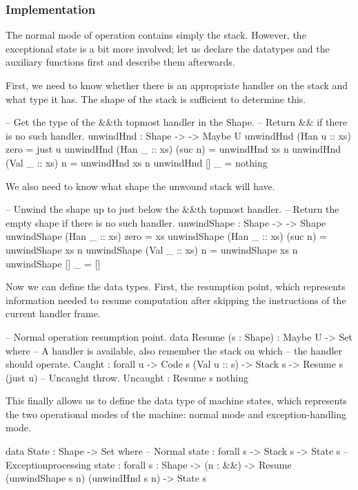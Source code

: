 
\subsubsection{Implementation}

The normal mode of operation contains simply the stack. However, the exceptional state
is a bit more involved; let us declare the datatypes and the auxiliary functions first
and describe them afterwards.

First, we need to know whether there is an appropriate handler on the stack and what type
it has. The shape of the stack is sufficient to determine this.
\begin{code}
  -- Get the type of the &&\-th top\-most handler in the Shape.
  -- Return && if there is no such handler.
  unwindHnd : Shape -> \bN -> Maybe U
  unwindHnd (Han u :: xs) zero    = just u
  unwindHnd (Han _ :: xs) (suc n) = unwindHnd xs n
  unwindHnd (Val _ :: xs) n       = unwindHnd xs n
  unwindHnd []           _       = nothing
\end{code}

\noindent We also need to know what shape the unwound stack will have.
\begin{code}
  -- Unwind the shape up to just below the &&\-th top\-most handler.
  -- Return the empty shape if there is no such handler.
  unwindShape : Shape -> \bN -> Shape
  unwindShape (Han _ :: xs) zero    = xs
  unwindShape (Han _ :: xs) (suc n) = unwindShape xs n
  unwindShape (Val _ :: xs) n       = unwindShape xs n
  unwindShape []           _       = []
\end{code}

\noindent Now we can define the data types. First, the resumption point, which
represents information needed to resume computation after skipping the instructions
of the current handler frame.
\begin{code}
  -- Normal operation resumption point.
  data Resume (s : Shape) : Maybe U -> Set where
    -- A handler is available, also remember the stack on which
    -- the handler should operate.
    Caught : forall {u} -> Code s (Val u :: s) -> Stack s -> Resume s (just u)
    -- Uncaught throw.
    Uncaught : Resume s nothing
\end{code}

\noindent This finally allows us to define the data type of machine states, which represents
the two operational modes of the machine: normal mode and exception-handling mode.
\begin{code}
  data State : Shape -> Set where
  	-- Normal state
  	\tick[_] : forall {s} -> Stack s -> State s
  	-- Exception\-processing state
  	\x[_,_] : forall {s : Shape}
  	  -> (n : \bN&\!&)
  	  -> Resume (unwindShape s n) (unwindHnd s n)
  	  -> State s
\end{code}

